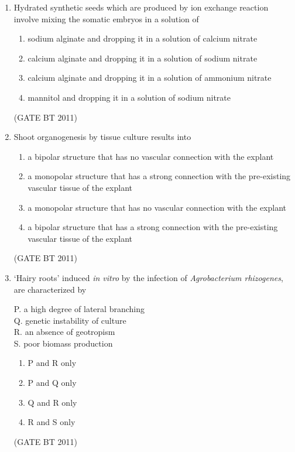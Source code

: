 \documentclass[journal,12pt,onecolumn]{IEEEtran}
\begin{document}
\begin{enumerate}
    \item Hydrated synthetic seeds which are produced by ion exchange reaction involve mixing the somatic embryos in a solution of
    \begin{enumerate}
        \item sodium alginate and dropping it in a solution of calcium nitrate
        \item calcium alginate and dropping it in a solution of sodium nitrate
        \item calcium alginate and dropping it in a solution of ammonium nitrate
        \item mannitol and dropping it in a solution of sodium nitrate
    \end{enumerate}
    \hfill(GATE BT 2011)
    
\item Shoot organogenesis by tissue culture results into
    \begin{enumerate}
        \item a bipolar structure that has no vascular connection with the explant
        \item a monopolar structure that has a strong connection with the pre-existing vascular tissue of the explant
        \item a monopolar structure that has no vascular connection with the explant
        \item a bipolar structure that has a strong connection with the pre-existing vascular tissue of the explant
    \end{enumerate}
     \hfill(GATE BT 2011)

\item ‘Hairy roots’ induced \textit{in vitro} by the infection of \textit{Agrobacterium rhizogenes}, are characterized by 

    P. a high degree of lateral branching  \\
    Q. genetic instability of culture  \\
    R. an absence of geotropism\\
    S. poor biomass production  

    \begin{multicols}{2}
    \begin{enumerate}
        \item P and R only
        \item P and Q only
        \item Q and R only
        \item R and S only
    \end{enumerate}
    \end{multicols} \hfill(GATE BT 2011)


\end{enumerate}
\end{document}
